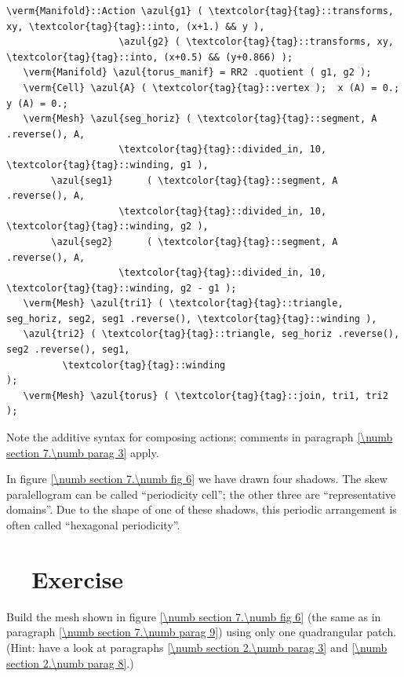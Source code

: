 \begin{Verbatim}[commandchars=\\\{\},formatcom=\small\tt,frame=single,
   label=parag-\ref{\numb section 7.\numb parag 9}.cpp,rulecolor=\color{coment},
   baselinestretch=0.94,framesep=2mm                                            ]
   \verm{Manifold}::Action \azul{g1} ( \textcolor{tag}{tag}::transforms, xy, \textcolor{tag}{tag}::into, (x+1.) && y ),
                    \azul{g2} ( \textcolor{tag}{tag}::transforms, xy, \textcolor{tag}{tag}::into, (x+0.5) && (y+0.866) );
   \verm{Manifold} \azul{torus_manif} = RR2 .quotient ( g1, g2 );
   \verm{Cell} \azul{A} ( \textcolor{tag}{tag}::vertex );  x (A) = 0.;  y (A) = 0.;
   \verm{Mesh} \azul{seg_horiz} ( \textcolor{tag}{tag}::segment, A .reverse(), A,
                    \textcolor{tag}{tag}::divided_in, 10, \textcolor{tag}{tag}::winding, g1 ),
        \azul{seg1}      ( \textcolor{tag}{tag}::segment, A .reverse(), A,
                    \textcolor{tag}{tag}::divided_in, 10, \textcolor{tag}{tag}::winding, g2 ),
        \azul{seg2}      ( \textcolor{tag}{tag}::segment, A .reverse(), A,
                    \textcolor{tag}{tag}::divided_in, 10, \textcolor{tag}{tag}::winding, g2 - g1 );
   \verm{Mesh} \azul{tri1} ( \textcolor{tag}{tag}::triangle, seg_horiz, seg2, seg1 .reverse(), \textcolor{tag}{tag}::winding ),
   \azul{tri2} ( \textcolor{tag}{tag}::triangle, seg_horiz .reverse(), seg2 .reverse(), seg1,
          \textcolor{tag}{tag}::winding                                             );
   \verm{Mesh} \azul{torus} ( \textcolor{tag}{tag}::join, tri1, tri2 );
\end{Verbatim}

Note the additive syntax for composing actions; comments in paragraph
\ref{\numb section 7.\numb parag 3} apply.

In figure \ref{\numb section 7.\numb fig 6} we have drawn four shadows.
The skew paralellogram can be called ``periodicity cell'';
the other three are ``representative domains''.
Due to the shape of one of these shadows, this periodic arrangement is often called
``hexagonal periodicity''.


\section{~~Exercise}\label{\numb section 7.\numb parag 10}

Build the mesh shown in figure \ref{\numb section 7.\numb fig 6}
(the same as in paragraph \ref{\numb section 7.\numb parag 9}) using only one quadrangular patch.
(Hint: have a look at paragraphs \ref{\numb section 2.\numb parag 3} and
\ref{\numb section 2.\numb parag 8}.)


